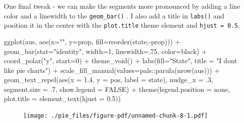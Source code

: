 \documentclass[
  letterpaper,
  DIV=11,
  numbers=noendperiod]{scrreprt}
\newenvironment{Shaded}{\begin{snugshade}}{\end{snugshade}}
\newcommand{\AttributeTok}[1]{\textcolor[rgb]{0.40,0.45,0.13}{#1}}
\newcommand{\ConstantTok}[1]{\textcolor[rgb]{0.56,0.35,0.01}{#1}}
\newcommand{\DecValTok}[1]{\textcolor[rgb]{0.68,0.00,0.00}{#1}}
\newcommand{\FloatTok}[1]{\textcolor[rgb]{0.68,0.00,0.00}{#1}}
\newcommand{\FunctionTok}[1]{\textcolor[rgb]{0.28,0.35,0.67}{#1}}
\newcommand{\NormalTok}[1]{\textcolor[rgb]{0.00,0.23,0.31}{#1}}
\newcommand{\SpecialCharTok}[1]{\textcolor[rgb]{0.37,0.37,0.37}{#1}}
\newcommand{\StringTok}[1]{\textcolor[rgb]{0.13,0.47,0.30}{#1}}
\begin{document}
One final tweak - we can make the segments more pronounced by adding a
line color and a linewidth to the \texttt{geom\_bar()} . I also add a
title in \texttt{labs()} and position it in the center with the
\texttt{plot.title} theme element and \texttt{hjust\ =\ 0.5}.

\begin{Shaded}
\begin{Highlighting}[]
\FunctionTok{ggplot}\NormalTok{(aus, }\FunctionTok{aes}\NormalTok{(}\AttributeTok{x=}\StringTok{""}\NormalTok{, }\AttributeTok{y=}\NormalTok{prop, }\AttributeTok{fill=}\FunctionTok{reorder}\NormalTok{(state,}\SpecialCharTok{{-}}\NormalTok{prop))) }\SpecialCharTok{+}
  \FunctionTok{geom\_bar}\NormalTok{(}\AttributeTok{stat=}\StringTok{"identity"}\NormalTok{, }\AttributeTok{width=}\DecValTok{1}\NormalTok{, }\AttributeTok{linewidth=}\NormalTok{.}\DecValTok{75}\NormalTok{, }\AttributeTok{color=}\StringTok{\textquotesingle{}black\textquotesingle{}}\NormalTok{) }\SpecialCharTok{+}
  \FunctionTok{coord\_polar}\NormalTok{(}\StringTok{"y"}\NormalTok{, }\AttributeTok{start=}\DecValTok{0}\NormalTok{) }\SpecialCharTok{+}
  \FunctionTok{theme\_void}\NormalTok{() }\SpecialCharTok{+}
  \FunctionTok{labs}\NormalTok{(}\AttributeTok{fill=}\StringTok{"State"}\NormalTok{, }
       \AttributeTok{title =} \StringTok{"I don\textquotesingle{}t like pie charts"}\NormalTok{) }\SpecialCharTok{+}
  \FunctionTok{scale\_fill\_manual}\NormalTok{(}\AttributeTok{values=}\NormalTok{pals}\SpecialCharTok{::}\FunctionTok{parula}\NormalTok{(}\FunctionTok{nrow}\NormalTok{(aus))) }\SpecialCharTok{+}
  \FunctionTok{geom\_text\_repel}\NormalTok{(}\FunctionTok{aes}\NormalTok{(}\AttributeTok{x =} \FloatTok{1.4}\NormalTok{, }\AttributeTok{y =}\NormalTok{ pos, }\AttributeTok{label =}\NormalTok{ state), }
                    \AttributeTok{nudge\_x =}\NormalTok{ .}\DecValTok{3}\NormalTok{, }
                    \AttributeTok{segment.size =}\NormalTok{ .}\DecValTok{7}\NormalTok{, }
                    \AttributeTok{show.legend =} \ConstantTok{FALSE}\NormalTok{) }\SpecialCharTok{+}
  \FunctionTok{theme}\NormalTok{(}\AttributeTok{legend.position =} \StringTok{\textquotesingle{}none\textquotesingle{}}\NormalTok{,}
        \AttributeTok{plot.title =} \FunctionTok{element\_text}\NormalTok{(}\AttributeTok{hjust =} \FloatTok{0.5}\NormalTok{)) }
\end{Highlighting}
\end{Shaded}

\begin{figure}[H]

{\centering \texttt{[image: ./pie\_files/figure-pdf/unnamed-chunk-8-1.pdf]}

}

\end{figure}
\end{document}
